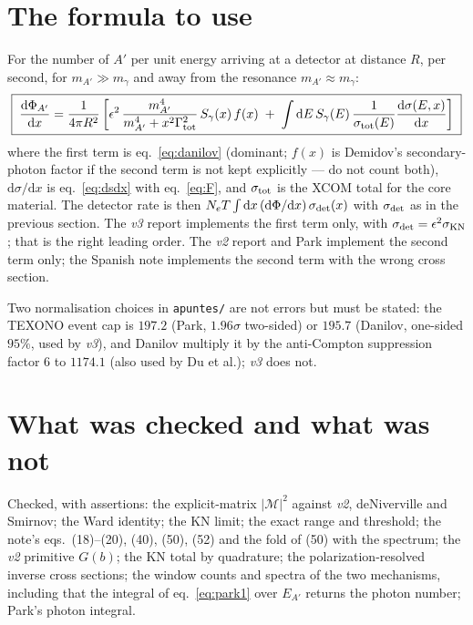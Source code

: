 \documentclass[11pt,a4paper]{article}
\newcommand{\Ap}{A'}
\newcommand{\eps}{\epsilon}
\newcommand{\KN}{\mathrm{KN}}
\newcommand{\dd}{\mathrm{d}}
\begin{document}
\section{The formula to use}
For the number of $\Ap$ per unit energy arriving at a detector at distance $R$, per second, for $m_{\Ap}\gg m_\gamma$
and away from the resonance $m_{\Ap}\approx m_\gamma$:
\begin{equation}
\boxed{\;
\frac{\dd\Phi_{\Ap}}{\dd x}=\frac{1}{4\pi R^2}\left[\eps^2\,\frac{m_{\Ap}^4}{m_{\Ap}^4+x^2\Gamma_{\rm tot}^2}\,S_\gamma(x)\,f(x)
\;+\;\int\dd E\,S_\gamma(E)\,\frac{1}{\sigma_{\rm tot}(E)}\frac{\dd\sigma(E,x)}{\dd x}\right]
\;}
\label{eq:final}
\end{equation}
where the first term is eq.~\eqref{eq:danilov} (dominant; $f(x)$ is Demidov's secondary-photon factor if the second
term is not kept explicitly --- do not count both), $\dd\sigma/\dd x$ is eq.~\eqref{eq:dsdx} with eq.~\eqref{eq:F}, and
$\sigma_{\rm tot}$ is the XCOM total for the core material. The detector rate is then $N_e T\int\dd x\,(\dd\Phi/\dd x)\,
\sigma_{\rm det}(x)$ with $\sigma_{\rm det}$ as in the previous section. The \emph{v3} report implements the first term
only, with $\sigma_{\rm det}=\eps^2\sigma_\KN$; that is the right leading order. The \emph{v2} report and Park implement
the second term only; the Spanish note implements the second term with the wrong cross section.

Two normalisation choices in \texttt{apuntes/} are not errors but must be stated: the TEXONO event cap is $197.2$
(Park, $1.96\sigma$ two-sided) or $195.7$ (Danilov, one-sided $95\%$, used by \emph{v3}), and Danilov multiply it by
the anti-Compton suppression factor 6 to $1174.1$ (also used by Du et al.); \emph{v3} does not.

\section{What was checked and what was not}
\label{sec:receipt}
Checked, with assertions: the explicit-matrix $|\mathcal M|^2$ against \emph{v2}, deNiverville and Smirnov; the Ward
identity; the KN limit; the exact range and threshold; the note's eqs.~(18)--(20), (40), (50), (52) and the fold of (50) with the spectrum; the \emph{v2}
primitive $G(b)$; the KN total by quadrature; the polarization-resolved inverse cross sections; the window counts and
spectra of the two mechanisms, including that the integral of eq.~\eqref{eq:park1} over $E_{\Ap}$ returns the photon
number; Park's photon integral.
\end{document}
